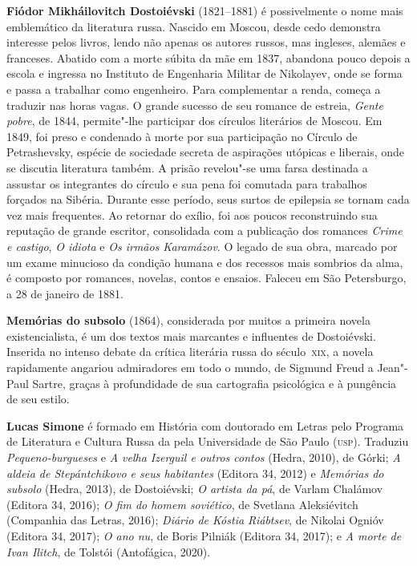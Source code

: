 \textbf{Fiódor Mikháilovitch Dostoiévski} (1821--1881) é possivelmente o nome mais emblemático da literatura russa. Nascido em Moscou, desde cedo demonstra interesse pelos livros, lendo não apenas os autores russos, mas ingleses, alemães e franceses. Abatido com a morte súbita da mãe em 1837, abandona pouco depois a escola e ingressa no Instituto de Engenharia Militar de Nikolayev, onde se forma e passa a trabalhar como engenheiro. Para complementar a renda, começa a traduzir nas horas vagas. O grande sucesso de seu romance de estreia, \textit{Gente pobre}, de 1844, permite"-lhe participar dos círculos literários de Moscou. Em 1849, foi preso e condenado à morte por sua participação no Círculo de Petrashevsky, espécie de sociedade secreta de aspirações utópicas e liberais, onde se discutia literatura também. A prisão revelou"-se uma farsa destinada a assustar os integrantes do círculo e sua pena foi comutada para trabalhos forçados na Sibéria. Durante esse período, seus surtos de epilepsia se tornam cada vez mais frequentes. Ao retornar do exílio, foi aos poucos reconstruindo sua reputação de grande escritor, consolidada com a publicação dos romances \textit{Crime e castigo}, \textit{O idiota} e \textit{Os irmãos Karamázov}. O legado de sua obra, marcado por um exame minucioso da condição humana e dos recessos mais sombrios da alma, é composto por romances, novelas, contos e ensaios. Faleceu em São Petersburgo, a 28 de janeiro de 1881.

\textbf{Memórias do subsolo} (1864), considerada por muitos a primeira
novela existencialista, é um dos textos mais marcantes e influentes de Dostoiévski. 
Inserida no intenso debate da crítica literária russa do século~\textsc{xix}, a novela 
rapidamente angariou admiradores em todo o mundo, de Sigmund Freud a Jean"-Paul Sartre,
graças à profundidade de sua cartografia psicológica e à pungência de seu estilo.
        
\textbf{Lucas Simone} é formado em História com doutorado em Letras pelo Programa de Literatura e Cultura Russa da pela Universidade de São Paulo (\textsc{usp}). Traduziu \textit{Pequeno-burgueses} e \textit{A velha Izerguil e outros contos} (Hedra, 2010), de Górki; \textit{A aldeia de Stepántchikovo e seus habitantes} (Editora 34, 2012) e \textit{Memórias do subsolo} (Hedra, 2013), de Dostoiévski; \textit{O artista da pá}, de Varlam Chalámov (Editora 34, 2016); \textit{O fim do homem soviético}, de Svetlana Aleksiévitch (Companhia das Letras, 2016); \textit{Diário de Kóstia Riábtsev}, de Nikolai Ognióv (Editora 34, 2017); \textit{O ano nu}, de Boris Pilniák (Editora 34, 2017); e \textit{A morte de Ivan Ilitch}, de Tolstói (Antofágica, 2020).


